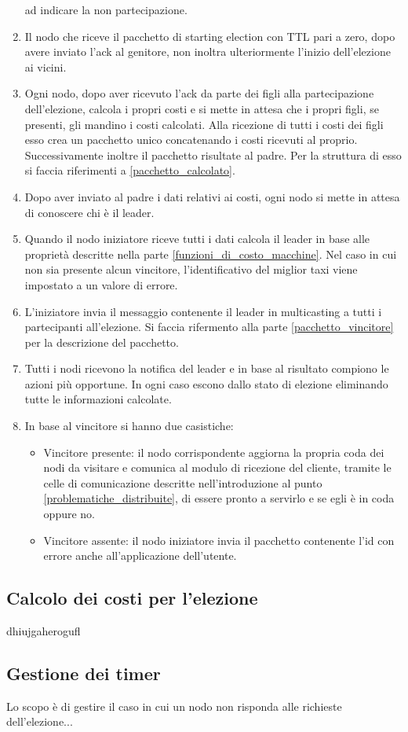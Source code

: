 \begin{enumerate}
	ad indicare la non partecipazione.
	\item Il nodo che riceve il pacchetto di starting election con TTL pari a zero, dopo avere inviato l'ack al genitore, non inoltra ulteriormente l'inizio dell'elezione ai vicini.
	\item Ogni nodo, dopo aver ricevuto l'ack da parte dei figli alla partecipazione dell'elezione, calcola i propri costi e si mette in attesa che i propri figli, se presenti, gli mandino i costi calcolati. Alla ricezione di tutti i costi dei figli esso crea un pacchetto unico concatenando i costi ricevuti al proprio. Successivamente inoltre il pacchetto risultate al padre. Per la struttura di esso si faccia riferimenti a \ref{pacchetto_calcolato}.
	\item Dopo aver inviato al padre i dati relativi ai costi, ogni nodo si mette in attesa di conoscere chi è il leader.
	\item Quando il nodo iniziatore riceve tutti i dati calcola il leader in base alle proprietà descritte nella parte \ref{funzioni_di_costo_macchine}. Nel caso in cui non sia presente alcun vincitore, l'identificativo del miglior taxi viene impostato a un valore di errore.
	\item L'iniziatore invia il messaggio contenente il leader in multicasting a tutti i partecipanti all'elezione. Si faccia rifermento alla parte \ref{pacchetto_vincitore} per la descrizione del pacchetto.
	\item Tutti i nodi ricevono la notifica del leader e in base al risultato compiono le azioni più opportune. In ogni caso escono dallo stato di elezione eliminando tutte le informazioni calcolate.
	\item In base al vincitore si hanno due casistiche:
		\begin{itemize}
			\item Vincitore presente: il nodo corrispondente aggiorna la propria coda dei nodi da visitare e comunica al modulo di ricezione del cliente, tramite le celle di comunicazione descritte nell'introduzione al punto \ref{problematiche_distribuite}, di essere pronto a servirlo e se egli è in coda oppure no.
			\item Vincitore assente: il nodo iniziatore invia il pacchetto contenente l'id con errore anche all'applicazione dell'utente.
		\end{itemize}
\end{enumerate}

\subsection{Calcolo dei costi per l'elezione}\label{implementazione_calcolo_costi}
dhiujgaherogufl

\subsection{Gestione dei timer}
Lo scopo è di gestire il caso in cui un nodo non risponda alle richieste dell'elezione...